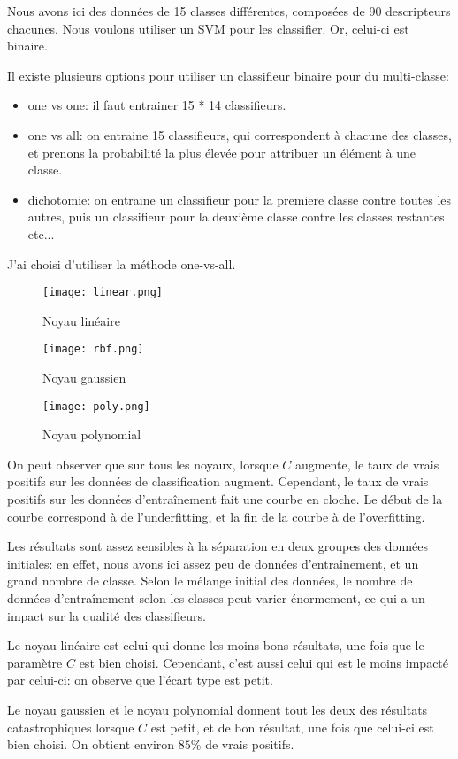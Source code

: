 \documentclass{article}
\begin{document}
Nous avons ici des données de 15 classes différentes, composées de 90
descripteurs chacunes. Nous voulons utiliser un SVM pour les classifier. Or,
celui-ci est binaire.

Il existe plusieurs options pour utiliser un classifieur binaire pour du
multi-classe:

\begin{itemize}
\item one vs one: il faut entrainer 15 * 14 classifieurs.
\item one vs all: on entraine 15 classifieurs, qui correspondent à chacune des
classes, et prenons la probabilité la plus élevée pour attribuer un élément à
une classe.
\item dichotomie: on entraine un classifieur pour la premiere classe contre
toutes les autres, puis un classifieur pour la deuxième classe contre les
classes restantes etc...
\end{itemize}

J'ai choisi d'utiliser la méthode one-vs-all.

\begin{figure}
\texttt{[image: linear.png]}
\caption{Noyau linéaire}
\end{figure}

\begin{figure}
\texttt{[image: rbf.png]}
\caption{Noyau gaussien}
\end{figure}

\begin{figure}
\texttt{[image: poly.png]}
\caption{Noyau polynomial}
\end{figure}

On peut observer que sur tous les noyaux, lorsque $C$ augmente, le taux de
vrais positifs sur les données de classification augment. Cependant, le taux
de vrais positifs sur les données d'entraînement fait une courbe en cloche. Le
début de la courbe correspond à de l'underfitting, et la fin de la courbe à de
l'overfitting.

Les résultats sont assez sensibles à la séparation en deux groupes des données
initiales: en effet, nous avons ici assez peu de données d'entraînement, et un
grand nombre de classe. Selon le mélange initial des données, le nombre de
données d'entraînement selon les classes peut varier énormement, ce qui a un
impact sur la qualité des classifieurs.

Le noyau linéaire est celui qui donne les moins bons résultats, une fois que
le paramètre $C$ est bien choisi. Cependant, c'est aussi celui qui est le
moins impacté par celui-ci: on observe que l'écart type est petit.

Le noyau gaussien et le noyau polynomial donnent tout les deux des résultats
catastrophiques lorsque $C$ est petit, et de bon résultat, une fois que
celui-ci est bien choisi. On obtient environ $85\%$ de vrais positifs.
\end{document}
